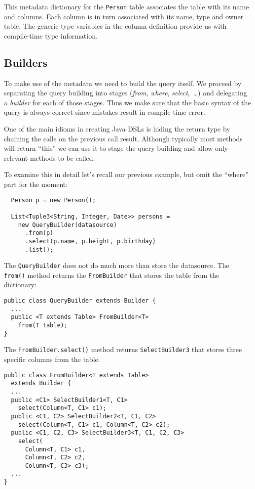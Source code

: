 \documentclass{sig-alternate}
\begin{document}
This metadata dictionary for the \verb!Person! table associates the table with
its name and columns. Each column is in turn associated with its name, type and
owner table. The generic type variables in the column definition provide us
with compile-time type information.

\subsection{Builders}

To make use of the metadata we need to build the query itself. We proceed by separating the query building into stages (\emph{from}, \emph{where}, \emph{select},~\ldots) and delegating a \emph{builder} for each of those stages. Thus we make sure that the basic syntax of the query is always correct since mistakes result in compile-time error.

One of the main idioms in creating Java DSLs is hiding the return type by chaining the calls on the previous call result. Although typically most methods will return ``this'' we can use it to stage the query building and allow only relevant methods to be called.

To examine this in detail let's recall our previous example, but omit the ``where'' part for the moment:

\begin{verbatim}
  Person p = new Person();

  List<Tuple3<String, Integer, Date>> persons = 
    new QueryBuilder(datasource)
      .from(p)
      .select(p.name, p.height, p.birthday)
      .list();
\end{verbatim}


The \verb!QueryBuilder! does not do much more than store the datasource. The \verb!from()! method returns the \verb!FromBuilder! that stores the table from the dictionary:

\begin{verbatim}
public class QueryBuilder extends Builder {
  ...
  public <T extends Table> FromBuilder<T> 
    from(T table);
}
\end{verbatim}

The \verb!FromBuilder.select()! method returns \verb!SelectBuilder3! that stores three specific columns from the table. 

\begin{verbatim}
public class FromBuilder<T extends Table> 
  extends Builder {
  ...
  public <C1> SelectBuilder1<T, C1> 
    select(Column<T, C1> c1);
  public <C1, C2> SelectBuilder2<T, C1, C2> 
    select(Column<T, C1> c1, Column<T, C2> c2);
  public <C1, C2, C3> SelectBuilder3<T, C1, C2, C3> 
    select(
      Column<T, C1> c1, 
      Column<T, C2> c2, 
      Column<T, C3> c3);
  ...
}
\end{verbatim}
\end{document}
